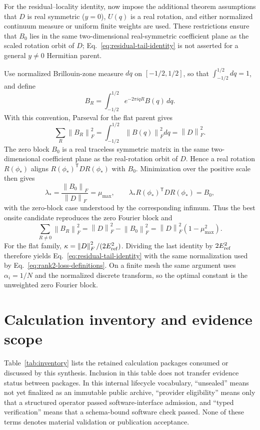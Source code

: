 \documentclass[11pt]{article}
\theoremstyle{definition}
\newcommand{\norm}[1]{\left\lVert#1\right\rVert}
\begin{document}
For the residual--locality identity, now impose the additional theorem assumptions that
$D$ is real symmetric ($y=0$), $U(q)$ is a real rotation, and either normalized
continuum measure or uniform finite weights are used.  These restrictions ensure that
$B_0$ lies in the same two-dimensional real-symmetric coefficient plane as the scaled
rotation orbit of $D$; Eq.~\eqref{eq:residual-tail-identity} is not asserted for a
general $y\ne0$ Hermitian parent.

Use normalized Brillouin-zone measure $dq$ on $[-1/2,1/2]$, so that
$\int_{-1/2}^{1/2}dq=1$, and define
\begin{equation}
 B_R=\int_{-1/2}^{1/2}e^{-2\pi iqR}B(q)\,dq.
\end{equation}
With this convention, Parseval for the flat parent gives
\begin{equation}
 \sum_R\norm{B_R}_F^2=\int_{-1/2}^{1/2}\norm{B(q)}_F^2dq=\norm D_F^2.
\end{equation}
The zero block $B_0$ is a real traceless symmetric matrix in the same two-dimensional
coefficient plane as the real-rotation orbit of $D$.  Hence a real rotation
$R(\phi_*)$ aligns $R(\phi_*)^\mathsf{T}DR(\phi_*)$ with $B_0$.  Minimization over the
positive scale then gives
\begin{equation}
 \lambda_*=\frac{\norm{B_0}_F}{\norm D_F}=\mu_{\max},
 \qquad
 \lambda_*R(\phi_*)^\mathsf{T}DR(\phi_*)=B_0,
\end{equation}
with the zero-block case understood by the corresponding infimum.  Thus the best onsite
candidate reproduces the zero Fourier block and
\begin{equation}
 \sum_{R\ne0}\norm{B_R}_F^2
 =\norm D_F^2-\norm{B_0}_F^2
 =\norm D_F^2(1-\mu_{\max}^2).
\end{equation}
For the flat family,
$\kappa=\norm D_F^2/(2E_{\rm ref}^2)$.  Dividing the last identity by
$2E_{\rm ref}^2$ therefore yields
Eq.~\eqref{eq:residual-tail-identity} with the same normalization used by
Eq.~\eqref{eq:rank2-loss-definitions}.  On a finite mesh the same argument uses
$\alpha_i=1/N$ and the normalized discrete transform, so the optimal constant is the
unweighted zero Fourier block.

\section{Calculation inventory and evidence scope}

Table~\ref{tab:inventory} lists the retained calculation packages consumed or discussed
by this synthesis.  Inclusion in this table does not transfer evidence status between
packages.  In this internal lifecycle vocabulary, ``unsealed'' means not yet finalized
as an immutable public archive, ``provider eligibility'' means only that a structured
operator passed software-interface admission, and ``typed verification'' means that a
schema-bound software check passed.  None of these terms denotes material validation or
publication acceptance.
\end{document}
